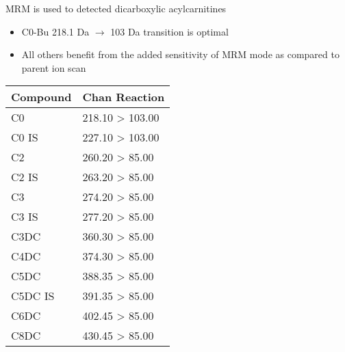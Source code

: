 \documentclass[presentation, smaller]{beamer}
\begin{document}
\begin{frame}[label={sec:orgheadline12}]{MRM is used to detected dicarboxylic acylcarnitines}
\begin{itemize}
\item C0-Bu 218.1 Da \(\to\) 103 Da transition is optimal
\item All others benefit from the added sensitivity of MRM mode as compared to parent ion scan
\end{itemize}

\small
\begin{center}
\begin{tabular}{ll}
Compound & Chan Reaction\\
\hline
C0 & 218.10 > 103.00\\
C0 IS & 227.10 > 103.00\\
C2 & 260.20 > 85.00\\
C2 IS & 263.20 > 85.00\\
C3 & 274.20 > 85.00\\
C3 IS & 277.20 > 85.00\\
C3DC & 360.30 > 85.00\\
C4DC & 374.30 > 85.00\\
C5DC & 388.35 > 85.00\\
C5DC IS & 391.35 > 85.00\\
C6DC & 402.45 > 85.00\\
C8DC & 430.45 > 85.00\\
\end{tabular}
\end{center}
\end{frame}
\end{document}
